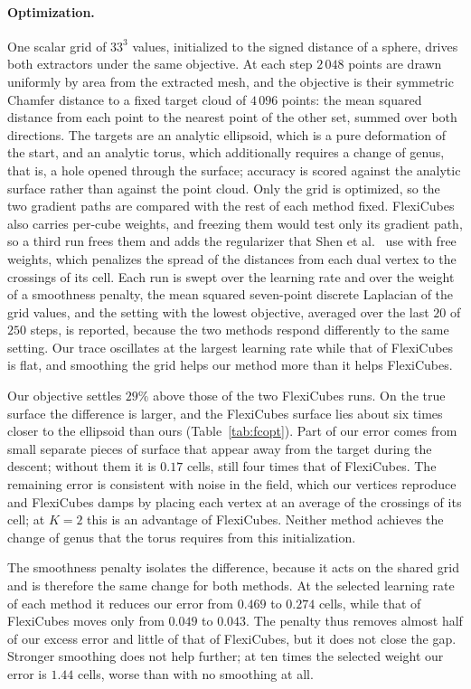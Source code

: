 \documentclass[11pt]{article}
\theoremstyle{definition}
\begin{document}
\paragraph*{Optimization.} One scalar grid of $33^3$ values, initialized to
the signed distance of a sphere, drives both extractors under the same
objective. At each step $2\,048$ points are drawn uniformly by area from the
extracted mesh, and the objective is their symmetric Chamfer distance to a
fixed target cloud of $4\,096$ points: the mean squared distance from each
point to the nearest point of the other set, summed over both directions.
The targets are an analytic ellipsoid, which
is a pure deformation of the start, and an analytic torus, which additionally
requires a change of genus, that is, a hole opened through the surface;
accuracy is scored against the analytic surface
rather than against the point cloud. Only the grid is optimized, so the two
gradient paths are compared with the rest of each method fixed. FlexiCubes
also carries per-cube weights, and freezing them would test only its
gradient path, so a third run frees them and adds the regularizer that
Shen et al.~\cite{shen2023} use with free weights, which penalizes the spread
of the distances from each dual vertex to the crossings of its cell. Each run
is swept over the learning rate and over the weight of a smoothness penalty,
the mean squared seven-point discrete Laplacian of the grid values, and the
setting with the lowest objective, averaged over the last $20$ of $250$
steps, is reported, because the two methods respond differently to the same
setting. Our trace oscillates at the largest learning rate while that of
FlexiCubes is flat, and smoothing the grid helps our method more than it
helps FlexiCubes.

Our objective settles $29\%$ above those of the two FlexiCubes runs. On
the true surface the difference is larger, and the FlexiCubes surface lies
about six times closer to the ellipsoid than ours (Table~\ref{tab:fcopt}).
Part of our error comes
from small separate pieces of surface that appear away from the target
during the descent; without them it is $0.17$ cells, still four times that
of FlexiCubes. The remaining error is consistent with noise in the field,
which our vertices reproduce and FlexiCubes damps by placing each vertex at
an average of the crossings of its cell; at $K=2$ this is an advantage of
FlexiCubes. Neither method achieves the change of genus that
the torus requires from this initialization.

The smoothness penalty isolates the difference, because it acts on
the shared grid and is therefore the same change for both methods. At the
selected learning rate of each method it reduces our error from
$0.469$ to $0.274$ cells, while that of FlexiCubes moves only from $0.049$ to
$0.043$. The penalty thus removes almost half of our excess error and little
of that of FlexiCubes, but it does not close the gap. Stronger smoothing
does not help further; at ten times the selected weight our error is $1.44$
cells, worse than with no smoothing at all.
\end{document}
